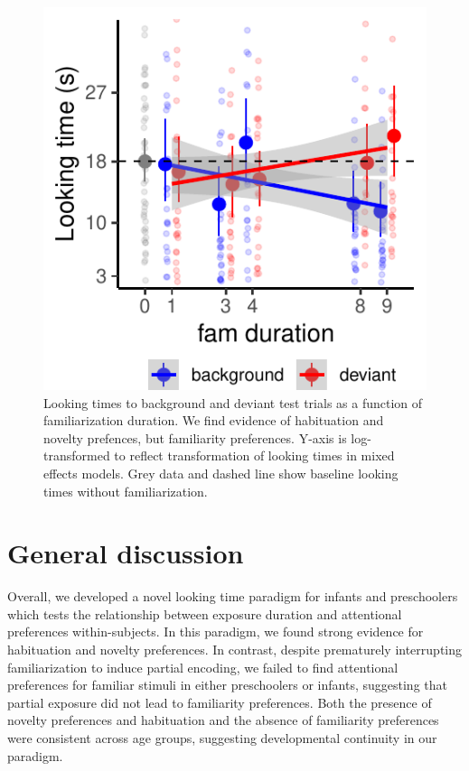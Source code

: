 \documentclass[10pt, letterpaper]{article}
\newenvironment{CodeChunk}{}{}
\begin{document}
\captionsetup{skip=4pt}

\begin{CodeChunk}
\begin{figure}[h]

\includegraphics{figs/infant_results-1} \hfill{}

\caption[Looking times to background and deviant test trials as a function of familiarization duration]{Looking times to background and deviant test trials as a function of familiarization duration. We find evidence of habituation and novelty prefences, but familiarity preferences. Y-axis is log-transformed to reflect transformation of looking times in mixed effects models. Grey data and dashed line show baseline looking times without familiarization.}\label{fig:infant_results}
\end{figure}
\end{CodeChunk}

\hypertarget{general-discussion}{%
\section{General discussion}\label{general-discussion}}

Overall, we developed a novel looking time paradigm for infants and
preschoolers which tests the relationship between exposure duration and
attentional preferences within-subjects. In this paradigm, we found
strong evidence for habituation and novelty preferences. In contrast,
despite prematurely interrupting familiarization to induce partial
encoding, we failed to find attentional preferences for familiar stimuli
in either preschoolers or infants, suggesting that partial exposure did
not lead to familiarity preferences. Both the presence of novelty
preferences and habituation and the absence of familiarity preferences
were consistent across age groups, suggesting developmental continuity
in our paradigm.
\end{document}
